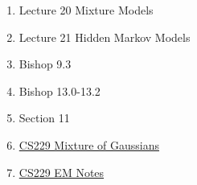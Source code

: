 \documentclass[11pt, oneside]{article}   	%
\begin{document}
\begin{enumerate}
	\item Lecture 20 Mixture Models
	\item Lecture 21 Hidden Markov Models
	\item Bishop 9.3
	\item Bishop 13.0-13.2
	\item Section 11
	\item \href{http://cs229.stanford.edu/notes/cs229-notes7b.pdf}{CS229 Mixture of Gaussians}
	\item \href{http://cs229.stanford.edu/notes/cs229-notes8.pdf}{CS229 EM Notes}
\end{enumerate}
\end{document}
